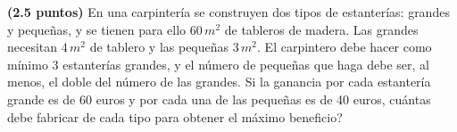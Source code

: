 
\textbf{(2.5 puntos)} En una carpintería se construyen dos tipos de estanterías: grandes y pequeñas, y se tienen para ello $60\,m^2$ de tableros de madera. Las grandes necesitan $4\,m^2$ de tablero y las pequeñas $3\,m^2$. El carpintero debe hacer como mínimo 3 estanterías grandes, y el número de pequeñas que haga debe ser, al menos, el doble del número de las grandes. Si la ganancia por cada estantería grande es de 60 euros y por cada una de las pequeñas es de 40 euros, \textquestiondown{}cuántas debe fabricar de cada tipo para obtener el máximo beneficio?
